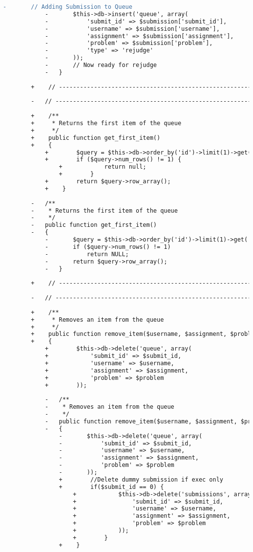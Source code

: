 \begin{lstlisting}[language=diff, caption=Perubahan pada kode Queue\_model.php]
			-		// Adding Submission to Queue
			-		$this->db->insert('queue', array(
			-			'submit_id' => $submission['submit_id'],
			-			'username' => $submission['username'],
			-			'assignment' => $submission['assignment'],
			-			'problem' => $submission['problem'],
			-			'type' => 'rejudge'
			-		));
			-		// Now ready for rejudge
			-	}
		
		+    // ------------------------------------------------------------------------
		
		-	// ------------------------------------------------------------------------
		
		+    /**
		+     * Returns the first item of the queue
		+     */
		+    public function get_first_item()
		+    {
			+        $query = $this->db->order_by('id')->limit(1)->get('queue');
			+        if ($query->num_rows() != 1) {
				+            return null;
				+        }
			+        return $query->row_array();
			+    }
		
		-	/**
		-	 * Returns the first item of the queue
		-	 */
		-	public function get_first_item()
		-	{
			-		$query = $this->db->order_by('id')->limit(1)->get('queue');
			-		if ($query->num_rows() != 1)
			-			return NULL;
			-		return $query->row_array();
			-	}
		
		+    // ------------------------------------------------------------------------
		
		-	// ------------------------------------------------------------------------
		
		+    /**
		+     * Removes an item from the queue
		+     */
		+    public function remove_item($username, $assignment, $problem, $submit_id)
		+    {
			+        $this->db->delete('queue', array(
			+            'submit_id' => $submit_id,
			+            'username' => $username,
			+            'assignment' => $assignment,
			+            'problem' => $problem
			+        ));
			
			-	/**
			-	 * Removes an item from the queue
			-	 */
			-	public function remove_item($username, $assignment, $problem, $submit_id)
			-	{
				-		$this->db->delete('queue', array(
				-			'submit_id' => $submit_id,
				-			'username' => $username,
				-			'assignment' => $assignment,
				-			'problem' => $problem
				-		));
				+        //Delete dummy submission if exec only
				+        if($submit_id == 0) {
					+            $this->db->delete('submissions', array(
					+                'submit_id' => $submit_id,
					+                'username' => $username,
					+                'assignment' => $assignment,
					+                'problem' => $problem
					+            ));
					+        }
				+    }
			

\end{lstlisting}
